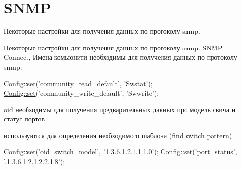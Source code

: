 \hypertarget{group__snmp}{\section{S\-N\-M\-P}
\label{group__snmp}
}


Некоторые настройки для получения данных по протоколу snmp.  


Некоторые настройки для получения данных по протоколу snmp. S\-N\-M\-P Connect, Имена комьюнити необходимы для получения данных по протоколу snmp\-: 
\begin{DoxyCode}
\hyperlink{class_config_aa485369b2925858d92e468d405bd0798}{Config::set}(\textcolor{stringliteral}{'community\_read\_default'}, \textcolor{stringliteral}{'Swstat'});
\hyperlink{class_config_aa485369b2925858d92e468d405bd0798}{Config::set}(\textcolor{stringliteral}{'community\_write\_default'}, \textcolor{stringliteral}{'Swwrite'});
\end{DoxyCode}
 oid необходимы для получения предварительных данных про модель свича и статус портов
\begin{DoxyItemize}
\item используются для определения необходимого шаблона (find switch pattern) 
\begin{DoxyCode}
\hyperlink{class_config_aa485369b2925858d92e468d405bd0798}{Config::set}(\textcolor{stringliteral}{'oid\_switch\_model'}, \textcolor{stringliteral}{'.1.3.6.1.2.1.1.1.0'});
\hyperlink{class_config_aa485369b2925858d92e468d405bd0798}{Config::set}(\textcolor{stringliteral}{'port\_status'}, \textcolor{stringliteral}{'.1.3.6.1.2.1.2.2.1.8'});
\end{DoxyCode}
 
\end{DoxyItemize}